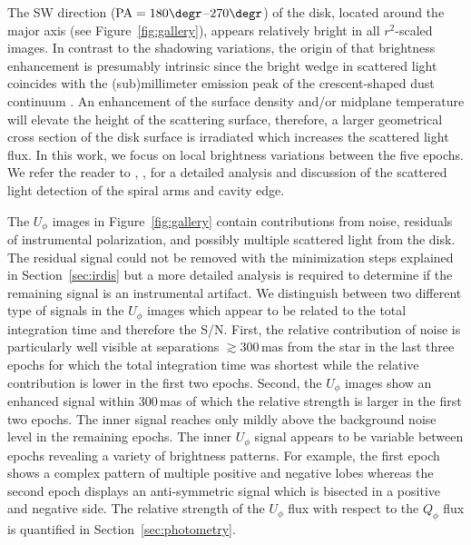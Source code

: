 \documentclass[twocolumn,tighten]{aastex61}
\begin{document}
The SW direction (${\rm PA} = 180\degr$--$270\degr$) of the disk, located around the major axis (see Figure~\ref{fig:gallery}), appears relatively bright in all $r^2$-scaled images. In contrast to the shadowing variations, the origin of that brightness enhancement is presumably intrinsic since the bright wedge in scattered light coincides with the (sub)millimeter emission peak of the crescent-shaped dust continuum \citep{perez2014,stolker2016}. An enhancement of the surface density and/or midplane temperature will elevate the height of the scattering surface, therefore, a larger geometrical cross section of the disk surface is irradiated which increases the scattered light flux. In this work, we focus on local brightness variations between the five epochs. We refer the reader to \citet{muto2012}, \citet{garufi2013}, \citet{stolker2016} for a detailed analysis and discussion of the scattered light detection of the spiral arms and cavity edge.

The $U_\phi$ images in Figure~\ref{fig:gallery} contain contributions from noise, residuals of instrumental polarization, and possibly multiple scattered light from the disk. The residual signal could not be removed with the minimization steps explained in Section~\ref{sec:irdis} but a more detailed analysis is required to determine if the remaining signal is an instrumental artifact. We distinguish between two different type of signals in the $U_\phi$ images which appear to be related to the total integration time and therefore the S/N. First, the relative contribution of noise is particularly well visible at separations $\gtrsim 300$\,mas from the star in the last three epochs for which the total integration time was shortest while the relative contribution is lower in the first two epochs. Second, the $U_\phi$ images show an enhanced signal within 300\,mas of which the relative strength is larger in the first two epochs. The inner signal reaches only mildly above the background noise level in the remaining epochs. The inner $U_\phi$ signal appears to be variable between epochs revealing a variety of brightness patterns. For example, the first epoch shows a complex pattern of multiple positive and negative lobes whereas the second epoch displays an anti-symmetric signal which is bisected in a positive and negative side. The relative strength of the $U_\phi$ flux with respect to the $Q_\phi$ flux is quantified in Section~\ref{sec:photometry}.
\end{document}

